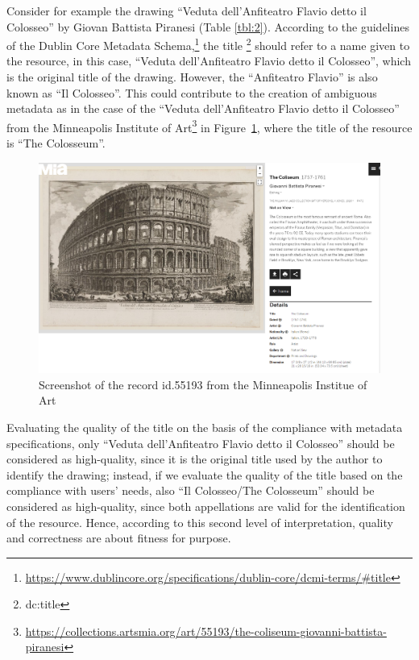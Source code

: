 \documentclass[epsfig,a4paper,12pt,titlepage]{book}
\begin{document}
 
Consider for example the drawing ``Veduta dell'Anfiteatro Flavio detto il Colosseo'' by Giovan Battista Piranesi (Table \ref{tbl:2}). According to the guidelines of the Dublin Core Metadata Schema,\footnote{\url{https://www.dublincore.org/specifications/dublin-core/dcmi-terms/\#title}} the title \footnote{dc:title} should refer to a name given to the resource, in this case, ``Veduta dell'Anfiteatro Flavio detto il Colosseo'', which is the original title of the drawing. However, the ``Anfiteatro Flavio'' is also known as ``Il Colosseo''. This could contribute to the creation of ambiguous metadata as in the case of the ``Veduta dell'Anfiteatro Flavio detto il Colosseo'' from the Minneapolis Institute of Art\footnote{\url{https://collections.artsmia.org/art/55193/the-coliseum-giovanni-battista-piranesi}} in Figure~\ref{fig:mia}, where the title of the resource is ``The Colosseum''.
 \begin{figure}[h!]
\includegraphics[width=16cm]{minneapolis.png}
\caption{Screenshot of the record id.55193 from the Minneapolis Institue of Art}
\label{fig:mia}       %
\end{figure}
 
 Evaluating the quality of the title on the basis of the compliance with metadata specifications, only ``Veduta dell'Anfiteatro Flavio detto il Colosseo'' should be considered as high-quality, since it is the original title used by the author to identify the drawing; instead, if we evaluate the quality of the title based on the compliance with users' needs, also ``Il Colosseo/The Colosseum'' should be considered as high-quality, since both appellations are valid for the identification of the resource. 
Hence, according to this second level of interpretation, quality and correctness are about fitness for purpose. 
\end{document}
